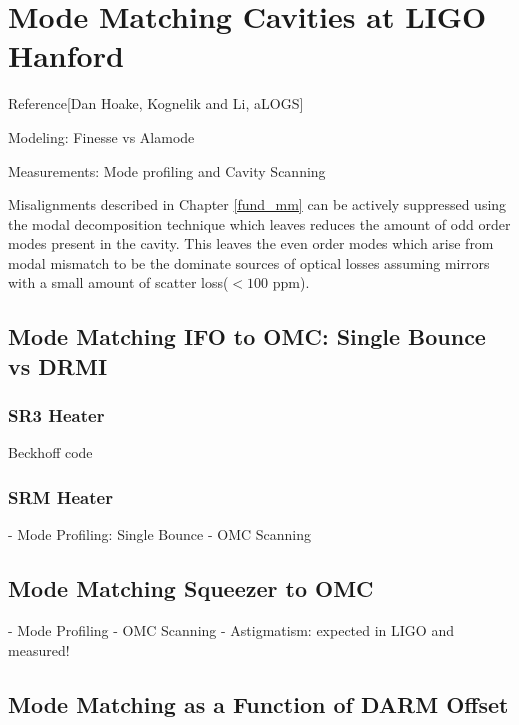 \chapter{Mode Matching Cavities at LIGO Hanford}
	Reference[Dan Hoake, Kognelik and Li, aLOGS]
	
	Modeling: Finesse vs Alamode
	
	Measurements: Mode profiling and Cavity Scanning
	
	Misalignments described in Chapter \ref{fund_mm} can be actively suppressed using the modal decomposition technique which leaves reduces the amount of odd order modes present in the cavity.  This leaves the even order modes which arise from modal mismatch to be the dominate sources of optical losses assuming mirrors with a small amount of scatter loss($<100$ ppm).

		
	
	\section{Mode Matching IFO to OMC: Single Bounce vs DRMI}
	\subsection{SR3 Heater}
	Beckhoff code
	
	
	\subsection{SRM Heater}
	- Mode Profiling: Single Bounce
	- OMC Scanning
	
	\section{Mode Matching Squeezer to OMC}
	- Mode Profiling
	- OMC Scanning
	- Astigmatism: expected in LIGO and measured!
	
	\section{Mode Matching as a Function of DARM Offset}

